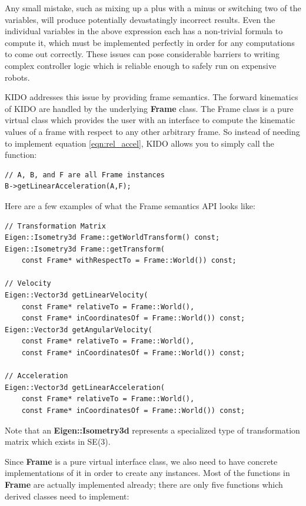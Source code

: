 Any small mistake, such as mixing up a plus with a minus or switching two of the variables, will produce potentially devastatingly incorrect results. Even the individual variables in the above expression each has a non-trivial formula to compute it, which must be implemented perfectly in order for any computations to come out correctly. These issues can pose considerable barriers to writing complex controller logic which is reliable enough to safely run on expensive robots.

KIDO addresses this issue by providing frame semantics. The forward kinematics of KIDO are handled by the underlying \textbf{Frame} class. The Frame class is a pure virtual class which provides the user with an interface to compute the kinematic values of a frame with respect to any other arbitrary frame. So instead of needing to implement equation \ref{eqn:rel_accel}, KIDO allows you to simply call the function:

\begin{lstlisting}
// A, B, and F are all Frame instances
B->getLinearAcceleration(A,F);
\end{lstlisting}

Here are a few examples of what the Frame semantics API looks like:

\begin{lstlisting}
// Transformation Matrix
Eigen::Isometry3d Frame::getWorldTransform() const;
Eigen::Isometry3d Frame::getTransform(
    const Frame* withRespectTo = Frame::World()) const;

// Velocity
Eigen::Vector3d getLinearVelocity(
    const Frame* relativeTo = Frame::World(),
    const Frame* inCoordinatesOf = Frame::World()) const;
Eigen::Vector3d getAngularVelocity(
    const Frame* relativeTo = Frame::World(),
    const Frame* inCoordinatesOf = Frame::World()) const;
    
// Acceleration
Eigen::Vector3d getLinearAcceleration(
    const Frame* relativeTo = Frame::World(),
    const Frame* inCoordinatesOf = Frame::World()) const;
\end{lstlisting}

Note that an \textbf{Eigen::Isometry3d} represents a specialized type of transformation matrix which exists in SE(3).

Since \textbf{Frame} is a pure virtual interface class, we also need to have concrete implementations of it in order to create any instances. Most of the functions in \textbf{Frame} are actually implemented already; there are only five functions which derived classes need to implement:

